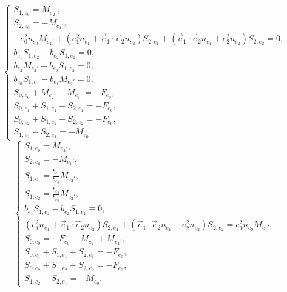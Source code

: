 \begin{equation*}
\left\{\begin{array}{l}
	S_{1,{e_0}} = M_{e_2'},\\
	S_{2,{e_0}} = -M_{e_1'},\\
	
	- e_0^2 n_{e_0} M_{e_1'} +
	\left( e_1^2 n_{e_1} + \vec e_1 \cdot \vec e_2 n_{e_2} \right) S_{2,{e_1}} +
	\left( \vec e_1 \cdot \vec e_2 n_{e_1} + e_2^2 n_{e_2} \right) S_{2,{e_2}} = 0, \\

	b_{e_1} S_{1,{e_2}} - b_{e_2} S_{1,{e_1}} = 0, \\
	b_{e_2} M_{e_2'} - b_{e_0} S_{1,{e_2}} = 0, \\
	b_{e_0} S_{1,{e_1}} - b_{e_1} M_{e_2'} = 0, \\

	S_{0,{e_0}} + M_{e_2'} - M_{e_1'} = - F_{e_0},\\
	S_{0,{e_1}} + S_{1,{e_1}} + S_{2,{e_1}} = - F_{e_0},\\
	S_{0,{e_2}} + S_{1,{e_2}} + S_{2,{e_2}} = - F_{e_0},\\

	S_{1,{e_2}} -  S_{2,{e_1}} = - M_{e_0}.
\end{array}\right.
\end{equation*}
\begin{equation*}
\left\{\begin{array}{l}
	S_{1,{e_0}} = M_{e_2'},\\
	S_{2,{e_0}} = -M_{e_1'},\\
	
	S_{1,{e_1}} = \frac{b_{e_1}}{b_{e_0}} M_{e_2'}, \\
	S_{1,{e_2}} = \frac{b_{e_2}}{b_{e_0}} M_{e_2'}, \\
	b_{e_1} S_{1,{e_2}} - b_{e_2} S_{1,{e_1}} \equiv 0, \\

	\left( e_1^2 n_{e_1} + \vec e_1 \cdot \vec e_2 n_{e_2} \right) S_{2,{e_1}} +
	\left( \vec e_1 \cdot \vec e_2 n_{e_1} + e_2^2 n_{e_2} \right) S_{2,{e_2}} = e_0^2 n_{e_0} M_{e_1'}, \\

	S_{0,{e_0}} = - F_{e_0} - M_{e_2'} + M_{e_1'},\\
	S_{0,{e_1}} + S_{1,{e_1}} + S_{2,{e_1}} = - F_{e_0},\\
	S_{0,{e_2}} + S_{1,{e_2}} + S_{2,{e_2}} = - F_{e_0},\\

	S_{1,{e_2}} -  S_{2,{e_1}} = - M_{e_0}.
\end{array}\right.
\end{equation*}
